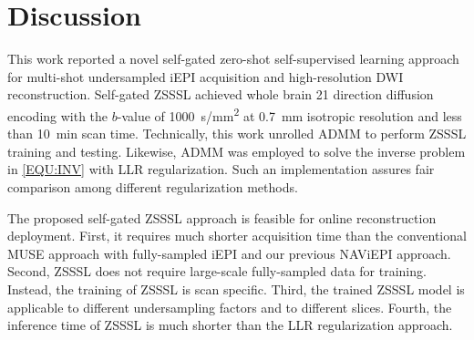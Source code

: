 \documentclass[journal,twoside,web]{ieeecolor}
\begin{document}
	\section{Discussion}

	This work reported a novel self-gated zero-shot self-supervised learning approach
	for multi-shot undersampled iEPI acquisition and high-resolution DWI reconstruction.
	Self-gated ZSSSL achieved whole brain 21 direction diffusion encoding
	with the $b$-value of \SI{1000}{s/mm^2}
	at \SI{0.7}{mm} isotropic resolution
	and less than \SI{10}{\minute} scan time.
	Technically, this work unrolled ADMM to perform ZSSSL training and testing.
	Likewise, ADMM was employed to solve the inverse problem in \cref{EQU:INV}
	with LLR regularization.
	Such an implementation assures fair comparison among different regularization methods.


	The proposed self-gated ZSSSL approach is feasible for online reconstruction deployment.
	First, it requires much shorter acquisition time than
	the conventional MUSE approach with fully-sampled iEPI and
	our previous NAViEPI approach.
	Second, ZSSSL does not require large-scale fully-sampled data for training.
	Instead, the training of ZSSSL is scan specific.
	Third, the trained ZSSSL model is applicable to different undersampling factors
	and to different slices.
	Fourth, the inference time of ZSSSL is much shorter than the LLR regularization approach.
\end{document}
